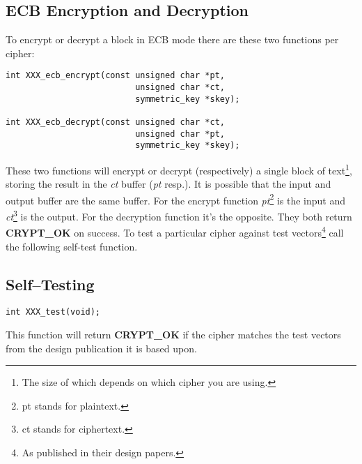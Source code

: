 \documentclass[synpaper]{book}
\begin{document}
\subsection{ECB Encryption and Decryption}
To encrypt or decrypt a block in ECB mode there are these two functions per cipher:
 
\begin{verbatim}
int XXX_ecb_encrypt(const unsigned char *pt,
                          unsigned char *ct,
                          symmetric_key *skey);

int XXX_ecb_decrypt(const unsigned char *ct,
                          unsigned char *pt,
                          symmetric_key *skey);
\end{verbatim}
These two functions will encrypt or decrypt (respectively) a single block of text\footnote{The size of which depends on
which cipher you are using.}, storing the result in the \textit{ct} buffer (\textit{pt} resp.).  It is possible that the input and output buffer are
the same buffer.  For the encrypt function \textit{pt}\footnote{pt stands for plaintext.} is the input and
\textit{ct}\footnote{ct stands for ciphertext.} is the output.  For the decryption function it's the opposite.  They both
return \textbf{CRYPT\_OK} on success.  To test a particular cipher against test vectors\footnote{As published in their design papers.}
call the following self-test function.

\subsection{Self--Testing}
\begin{verbatim}
int XXX_test(void);
\end{verbatim}
This function will return {\bf CRYPT\_OK} if the cipher matches the test vectors from the design publication it is
based upon.
\end{document}
